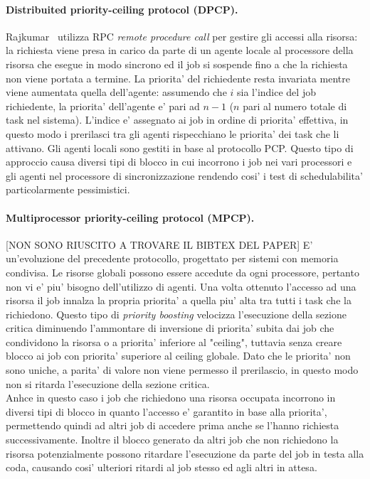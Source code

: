 \paragraph{Distribuited priority-ceiling protocol (DPCP).} Rajkumar~\cite{Rajkumar:1991:SRS:532621} utilizza RPC \textit{remote procedure call} per gestire gli accessi alla risorsa: la richiesta viene presa in carico da parte di un agente locale al processore della risorsa che esegue in modo sincrono ed il job si sospende fino a che la richiesta non viene portata a termine. La priorita' del richiedente resta invariata mentre viene aumentata quella dell'agente: assumendo che $i$ sia l'indice del job richiedente, la priorita' dell'agente e' pari ad $n - 1$ ($n$ pari al numero totale di task nel sistema). L'indice e' assegnato ai job in ordine di priorita' effettiva, in questo modo i prerilasci tra gli agenti rispecchiano le priorita' dei task che li attivano. Gli agenti locali sono gestiti in base al protocollo PCP. Questo tipo di approccio causa diversi tipi di blocco in cui incorrono i job nei vari processori e gli agenti nel processore di sincronizzazione rendendo cosi' i test di schedulabilita' particolarmente pessimistici.\\

\paragraph{Multiprocessor priority-ceiling protocol (MPCP).} [NON SONO RIUSCITO A TROVARE IL BIBTEX DEL PAPER] E' un'evoluzione del precedente protocollo, progettato per sistemi con memoria condivisa. Le risorse globali possono essere accedute da ogni processore, pertanto non vi e' piu' bisogno dell'utilizzo di agenti. Una volta ottenuto l'accesso ad una risorsa il job innalza la propria priorita' a quella piu' alta tra tutti i task che la richiedono. Questo tipo di \textit{priority boosting} velocizza l'esecuzione della sezione critica diminuendo l'ammontare di inversione di priorita' subita dai job che condividono la risorsa o a priorita' inferiore al "ceiling", tuttavia senza creare blocco ai job con priorita' superiore al ceiling globale. Dato che le priorita' non sono uniche, a parita' di valore non viene permesso il prerilascio, in questo modo non si ritarda l'esecuzione della sezione critica.\\
Anhce in questo caso i job che richiedono una risorsa occupata incorrono in diversi tipi di blocco in quanto l'accesso e' garantito in base alla priorita', permettendo quindi ad altri job di accedere prima anche se l'hanno richiesta successivamente. Inoltre il blocco generato da altri job che non richiedono la risorsa potenzialmente possono ritardare l'esecuzione da parte del job in testa alla coda, causando cosi' ulteriori ritardi al job stesso ed agli altri in attesa.\\

